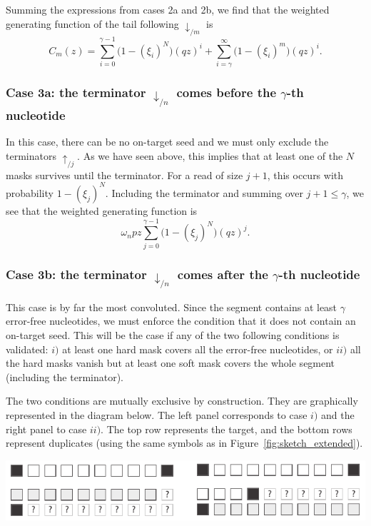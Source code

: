 \documentclass{article}
\newenvironment{inset}
{\vspace{0.5\baselineskip}\begin{center}}
{\end{center}\vspace{0.5\baselineskip}}
\begin{document}
Summing the expressions from cases 2a and 2b, we find that the
weighted generating function of the tail following $\downarrow_{/m}$ is
\begin{equation}
\label{eq:C}
C_m(z) =
\sum_{i=0}^{\gamma-1} \Big(1 - (\xi_i)^N \Big) (qz)^i +
  \sum_{i=\gamma}^\infty \Big(1 - (\xi_i)^m \Big) (qz)^i.
\end{equation}

\subsubsection*{Case 3a: the terminator $\downarrow_{/n}$ comes before the
$\gamma$-th nucleotide}

In this case, there can be no on-target seed and we must only exclude the
terminators $\uparrow_{/j}$. As we have seen above, this implies that at
least one of the $N$ masks survives until the terminator. For a read of
size $j+1$, this occurs with probability $1-(\xi_j)^N$. Including the
terminator and summing over $j+1 \leq \gamma$, we see that the weighted
generating function is
\begin{equation}
\omega_n pz \sum_{j=0}^{\gamma-1} \Big(1 - (\xi_j)^N \Big) (qz)^j.
\end{equation}

\subsubsection*{Case 3b: the terminator $\downarrow_{/n}$ comes after the
$\gamma$-th nucleotide}

This case is by far the most convoluted. Since the segment contains at
least $\gamma$ error-free nucleotides, we must enforce the condition that
it does not contain an on-target seed. This will be the case if any of the
two following conditions is validated: $i)$ at least one hard mask covers
all the error-free nucleotides, or $ii)$ all the hard masks vanish but at
least one soft mask covers the whole segment (including the terminator).

The two conditions are mutually exclusive by construction. They are
graphically represented in the diagram below. The left panel corresponds
to case $i)$ and the right panel to case $ii)$. The top row represents the
target, and the bottom rows represent duplicates (using the same symbols
as in Figure~\ref{fig:sketch_extended}).
\begin{inset}
\includegraphics{masks.pdf}
\end{inset}
\end{document}
